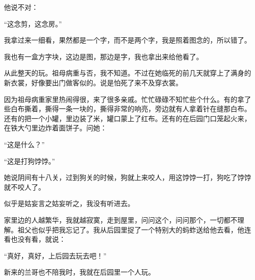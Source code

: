 \par 他说不对：
\par “这念剪，这念房。”
\par 我拿过来一细看，果然都是一个字，而不是两个字，我是照着图念的，所以错了。
\par 我也有一盒方字块，这边是图，那边是字，我也拿出来给他看了。
\par 从此整天的玩。祖母病重与否，我不知道。不过在她临死的前几天就穿上了满身的新衣裳，好像要出门做客似的。说是怕死了来不及穿衣裳。
\par 因为祖母病重家里热闹得很，来了很多亲戚。忙忙碌碌不知忙些个什么。有的拿了些白布撕着，撕得一条一块的，撕得非常的响亮，旁边就有人拿着针在缝那白布。还有的把一个小罐，里边装了米，罐口蒙上了红布。还有的在后园门口笼起火来，在铁大勺里边炸着面饼子。问她：
\par “这是什么？”
\par “这是打狗饽饽。”
\par 她说阴间有十八关，过到狗关的时候，狗就上来咬人，用这饽饽一打，狗吃了饽饽就不咬人了。
\par 似乎是姑妄言之姑妄听之，我没有听进去。
\par 家里边的人越繁华，我就越寂寞，走到屋里，问问这个，问问那个，一切都不理解。祖父也似乎把我忘记了。我从后园里捉了一个特别大的蚂蚱送给他去看，他连看也没有看，就说：
\par “真好，真好，上后园去玩去吧！”
\par 新来的兰哥也不陪我时，我就在后园里一个人玩。
